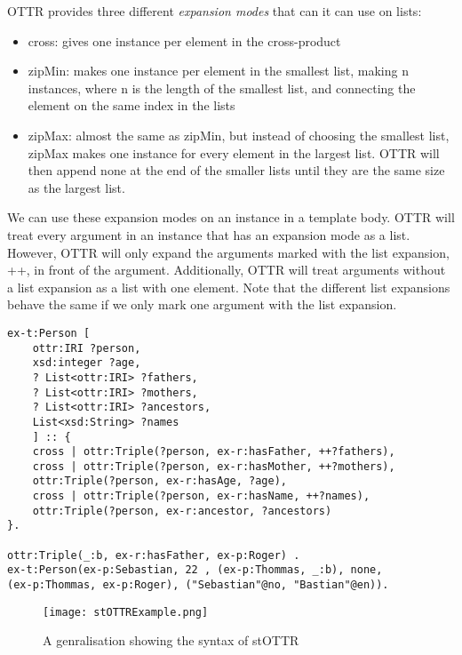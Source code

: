 \para
OTTR provides three different \emph{expansion modes} that can it can use on lists:
\begin{itemize}
    \item cross: gives one instance per element in the cross-product
    \item zipMin: makes one instance per element in the smallest list, making n instances, where n is the length of the smallest list, and connecting the element on the same index in the lists
    \item zipMax: almost the same as zipMin, but instead of choosing the smallest list, zipMax makes one instance for every element in the largest list. OTTR will then append none at the end of the smaller lists until they are the same size as the largest list. 
\end{itemize}
We can use these expansion modes on an instance in a template body. OTTR will treat every argument in an instance that has an expansion mode as a list. However, OTTR will only expand the arguments marked with the list expansion, ++, in front of the argument. Additionally, OTTR will treat arguments without a list expansion as a list with one element. Note that the different list expansions behave the same if we only mark one argument with the list expansion. 

\begin{lstlisting}[frame=single]
ex-t:Person [
    ottr:IRI ?person,
    xsd:integer ?age,
    ? List<ottr:IRI> ?fathers,
    ? List<ottr:IRI> ?mothers,
    ? List<ottr:IRI> ?ancestors,
    List<xsd:String> ?names
    ] :: {
    cross | ottr:Triple(?person, ex-r:hasFather, ++?fathers),
    cross | ottr:Triple(?person, ex-r:hasMother, ++?mothers),
    ottr:Triple(?person, ex-r:hasAge, ?age),
    cross | ottr:Triple(?person, ex-r:hasName, ++?names),
    ottr:Triple(?person, ex-r:ancestor, ?ancestors)
}.

ottr:Triple(_:b, ex-r:hasFather, ex-p:Roger) .
ex-t:Person(ex-p:Sebastian, 22 , (ex-p:Thommas, _:b), none, 
(ex-p:Thommas, ex-p:Roger), ("Sebastian"@no, "Bastian"@en)).
\end{lstlisting}

\begin{figure}
    \centering
    \texttt{[image: stOTTRExample.png]}
    \caption{A genralisation showing the syntax of stOTTR}
    \label{fig:stOTTERGenralisation}
\end{figure}

